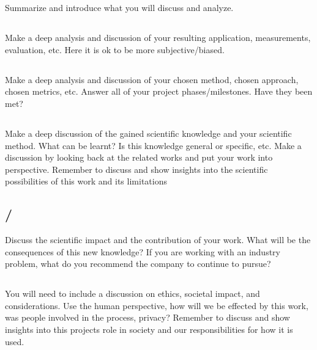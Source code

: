 \section{}\label{sec:discussion}
Summarize and introduce what you will discuss and analyze.

\subsection{}\label{subsec:discussion_analysis}
Make a deep analysis and discussion of your resulting application, measurements,
evaluation, etc. Here it is ok to be more subjective/biased.

\subsection{}\label{subsec:project_method_discussion}
Make a deep analysis and discussion of your chosen method, chosen approach,
chosen metrics, etc. Answer all of your project phases/milestones. Have they
been met?

\subsection{}\label{subsec:scientific_discussion}
Make a deep discussion of the gained scientific knowledge and your scientific
method. What can be learnt? Is this knowledge general or specific, etc. Make a
discussion by looking back at the related works and put your work into
perspective. Remember to discuss and show insights into the scientific
possibilities of this work and its limitations

\subsection{/}\label{subsec:recommendation} 

Discuss the scientific impact and the contribution of your work. What will be the consequences of
this new knowledge? If you are working with an industry problem, what do you recommend the company
to continue to pursue?

\subsection{}\label{subsec:ethical_discussions}
You will need to include a discussion on ethics, societal impact, and
considerations. Use the human perspective, how will we be effected by this work,
was people involved in the process, privacy? Remember to discuss and show
insights into this projects role in society and our responsibilities for how it
is used.
